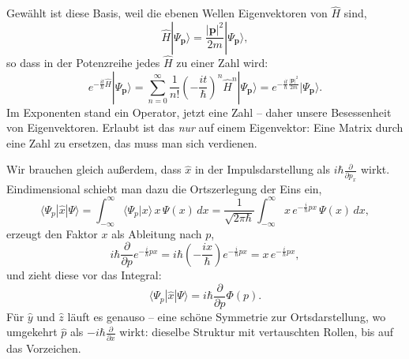 Gewählt ist diese Basis, weil die ebenen Wellen Eigenvektoren von $\widehat{H}$ sind,
\begin{equation}\label{eq:heigen}
	\widehat{H}|\Psi_{\mathbf{p}}\rangle = \frac{|\mathbf{p}|^2}{2m}|\Psi_{\mathbf{p}}\rangle,
\end{equation}
so dass in der Potenzreihe jedes $\widehat{H}$ zu einer Zahl wird:
\begin{equation}
	e^{-\frac{it}{\hbar}\widehat{H}}|\Psi_{\mathbf{p}}\rangle = \sum_{n=0}^{\infty}\frac{1}{n!}\left(-\frac{it}{\hbar}\right)^n \widehat{H}^n|\Psi_{\mathbf{p}}\rangle = e^{-\frac{it}{\hbar}\frac{|\mathbf{p}|^2}{2m}}|\Psi_{\mathbf{p}}\rangle.
\end{equation}
Im Exponenten stand ein Operator, jetzt eine Zahl -- daher unsere Besessenheit von Eigenvektoren. Erlaubt ist das \emph{nur} auf einem Eigenvektor: Eine Matrix durch eine Zahl zu ersetzen, das muss man sich verdienen.

Wir brauchen gleich außerdem, dass $\widehat{x}$ in der Impulsdarstellung als $i\hbar\frac{\partial}{\partial p_x}$ wirkt. Eindimensional schiebt man dazu die Ortszerlegung der Eins ein,
\begin{equation}
	\langle \Psi_p|\widehat{x}|\Psi\rangle = \int_{-\infty}^\infty \langle \Psi_p|x\rangle\, x\, \Psi(x)\,dx = \frac{1}{\sqrt{2\pi\hbar}}\int_{-\infty}^\infty x\, e^{-\frac{i}{\hbar}px}\,\Psi(x)\,dx,
\end{equation}
erzeugt den Faktor $x$ als Ableitung nach $p$,
\begin{equation}
	i\hbar\frac{\partial}{\partial p}e^{-\frac{i}{\hbar}px} = i\hbar\left(-\frac{ix}{\hbar}\right)e^{-\frac{i}{\hbar}px} = x\,e^{-\frac{i}{\hbar}px},
\end{equation}
und zieht diese vor das Integral:
\begin{equation}\label{eq:xinp}
	\langle \Psi_p|\widehat{x}|\Psi\rangle = i\hbar\frac{\partial}{\partial p}\Phi(p).
\end{equation}
Für $\widehat{y}$ und $\widehat{z}$ läuft es genauso -- eine schöne Symmetrie zur Ortsdarstellung, wo umgekehrt $\widehat{p}$ als $-i\hbar\frac{\partial}{\partial x}$ wirkt: dieselbe Struktur mit vertauschten Rollen, bis auf das Vorzeichen.

